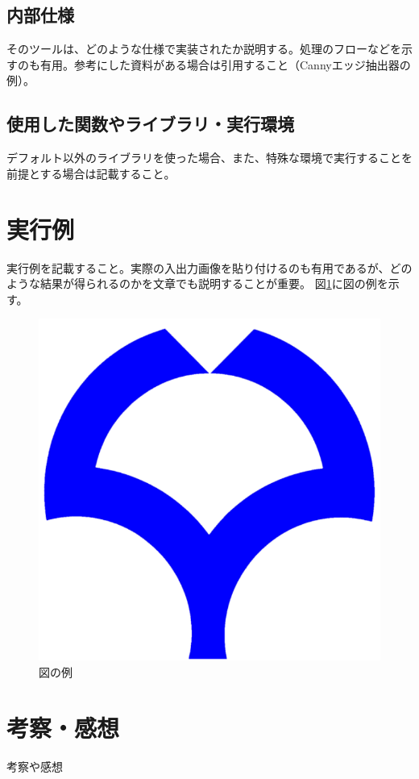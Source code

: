 \documentclass[twocolumn, a4paper]{jsarticle}
\begin{document}
\subsection{内部仕様}
そのツールは、どのような仕様で実装されたか説明する。処理のフローなどを示すのも有用。参考にした資料がある場合は引用すること（Cannyエッジ抽出器の例\cite{canny1986computational}）。

\subsection{使用した関数やライブラリ・実行環境}
デフォルト以外のライブラリを使った場合、また、特殊な環境で実行することを前提とする場合は記載すること。


\section{実行例}
実行例を記載すること。実際の入出力画像を貼り付けるのも有用であるが、どのような結果が得られるのかを文章でも説明することが重要。
図\ref{fig:ou}に図の例を示す。

\begin{figure}[t]
\centering
\includegraphics[width=\linewidth]{ou.png}
\caption{図の例}
\label{fig:ou}
\end{figure}

\section{考察・感想}
考察や感想



\end{document}
